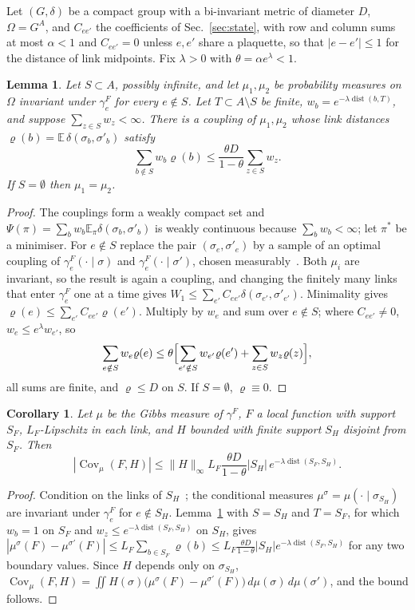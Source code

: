 \documentclass[aps,prd,twocolumn,superscriptaddress,nofootinbib,longbibliography,floatfix,amsmath,amssymb,10pt]{revtex4-2}
\newtheorem{lemma}[theorem]{Lemma}
\newtheorem{corollary}[theorem]{Corollary}
\theoremstyle{definition}
\theoremstyle{remark}
\newcommand{\E}{\mathbb{E}}
\newcommand{\Cov}{\operatorname{Cov}}
\newcommand{\dist}{\operatorname{dist}}
\begin{document}
Let $(G,\delta)$ be a compact group with a bi-invariant metric of diameter
$D$, $\Omega=G^A$, and $C_{ee'}$ the coefficients of Sec.~\ref{sec:state},
with row and column sums at most $\alpha<1$ and $C_{ee'}=0$ unless $e,e'$ share
a plaquette, so that $|e-e'|\le1$ for the distance of link midpoints. Fix
$\lambda>0$ with $\theta=\alpha e^\lambda<1$.

\begin{lemma}\label{lem:comparison}
Let $S\subset A$, possibly infinite, and let $\mu_1,\mu_2$ be probability
measures on $\Omega$ invariant under $\gamma^F_e$ for every $e\notin S$. Let
$T\subset A\setminus S$ be finite, $w_b=e^{-\lambda\dist(b,T)}$, and suppose
$\sum_{z\in S}w_z<\infty$. There is a coupling of $\mu_1,\mu_2$ whose link
distances $\varrho(b)=\E\,\delta(\sigma_b,\sigma'_b)$ satisfy
\[
\sum_{b\notin S}w_b\varrho(b)\le\frac{\theta D}{1-\theta}\sum_{z\in S}w_z .
\]
If $S=\emptyset$ then $\mu_1=\mu_2$.
\end{lemma}

\begin{proof}
The couplings form a weakly compact set and $\Psi(\pi)=\sum_bw_b\E_\pi\delta(
\sigma_b,\sigma'_b)$ is weakly continuous because $\sum_bw_b<\infty$; let $\pi^*$ be
a minimiser. For $e\notin S$ replace the pair $(\sigma_e,\sigma'_e)$ by a sample of
an optimal coupling of $\gamma^F_e(\cdot\mid\sigma)$ and $\gamma^F_e(\cdot\mid
\sigma')$, chosen measurably~\cite[Cor.~5.22]{Vil09}. Both $\mu_i$ are
invariant, so the result is again a coupling, and changing the finitely
many links that enter $\gamma^F_e$ one at a time gives $W_1\le\sum_{e'}C_{ee'}
\delta(\sigma_{e'},\sigma'_{e'})$. Minimality gives $\varrho(e)\le\sum_{e'}C_{ee'}
\varrho(e')$. Multiply by $w_e$ and sum over $e\notin S$; where $C_{ee'}\ne0$,
$w_e\le e^\lambda w_{e'}$, so
\[
\sum_{e\notin S}w_e\varrho(e)\le\theta\Bigl[\sum_{e'\notin S}w_{e'}\varrho(e')
+\sum_{z\in S}w_z\varrho(z)\Bigr],
\]
all sums are finite, and $\varrho\le D$ on $S$. If $S=\emptyset$, $\varrho\equiv0$.
\end{proof}

\begin{corollary}\label{cor:decay}
Let $\mu$ be the Gibbs measure of $\gamma^F$, $F$ a local function with
support $S_F$, $L_F$-Lipschitz in each link, and $H$ bounded with finite
support $S_H$ disjoint from $S_F$. Then
\[
|\Cov_\mu(F,H)|\le\|H\|_\infty L_F\frac{\theta D}{1-\theta}|S_H|\,
e^{-\lambda\dist(S_F,S_H)}.
\]
\end{corollary}

\begin{proof}
Condition on the links of $S_H$~\cite[Ch.~3]{Kal21}; the conditional
measures $\mu^\sigma=\mu(\cdot\mid\sigma_{S_H})$ are invariant under
$\gamma^F_e$ for $e\notin S_H$. Lemma~\ref{lem:comparison} with $S=S_H$ and
$T=S_F$, for which $w_b=1$ on $S_F$ and $w_z\le e^{-\lambda\dist(S_F,S_H)}$ on
$S_H$, gives
$|\mu^\sigma(F)-\mu^{\sigma'}(F)|\le L_F\sum_{b\in S_F}\varrho(b)\le
L_F\frac{\theta D}{1-\theta}|S_H|e^{-\lambda\dist(S_F,S_H)}$ for any two
boundary values. Since $H$ depends only on $\sigma_{S_H}$,
$\Cov_\mu(F,H)=\iint H(\sigma)\bigl(\mu^\sigma(F)-\mu^{\sigma'}(F)\bigr)\,
d\mu(\sigma)\,d\mu(\sigma')$, and the bound follows.
\end{proof}
\end{document}
